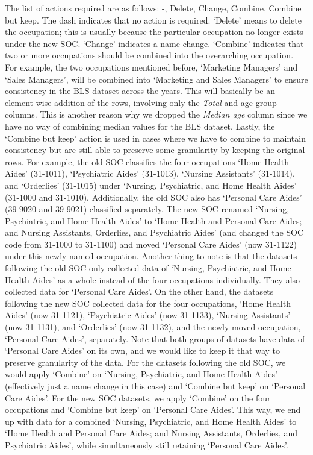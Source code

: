 \documentclass[11pt]{article}
\begin{document}
The list of actions required are as follows: -, Delete, Change, Combine, Combine but keep. The dash indicates that no action is required. `Delete' means to delete the occupation; this is usually because the particular occupation no longer exists under the new SOC. `Change' indicates a name change. `Combine' indicates that two or more occupations should be combined into the overarching occupation. For example, the two occupations mentioned before, `Marketing Managers' and `Sales Managers', will be combined into `Marketing and Sales Managers' to ensure consistency in the BLS dataset across the years. This will basically be an element-wise addition of the rows, involving only the \emph{Total} and age group columns. This is another reason why we dropped the \emph{Median age} column since we have no way of combining median values for the BLS dataset. Lastly, the `Combine but keep' action is used in cases where we have to combine to maintain consistency but are still able to preserve some granularity by keeping the original rows. For example, the old SOC classifies the four occupations `Home Health Aides' (31-1011), `Psychiatric Aides' (31-1013), `Nursing Assistants' (31-1014), and `Orderlies' (31-1015) under `Nursing, Psychiatric, and Home Health Aides' (31-1000 and 31-1010). Additionally, the old SOC also has `Personal Care Aides' (39-9020 and 39-9021) classified separately. The new SOC renamed `Nursing, Psychiatric, and Home Health Aides' to `Home Health and Personal Care Aides; and Nursing Assistants, Orderlies, and Psychiatric Aides' (and changed the SOC code from 31-1000 to 31-1100) and moved `Personal Care Aides' (now 31-1122) under this newly named occupation. Another thing to note is that the datasets following the old SOC only collected data of `Nursing, Psychiatric, and Home Health Aides' as a whole instead of the four occupations individually. They also collected data for `Personal Care Aides'. On the other hand, the datasets following the new SOC collected data for the four occupations, `Home Health Aides' (now 31-1121), `Psychiatric Aides' (now 31-1133), `Nursing Assistants' (now 31-1131), and `Orderlies' (now 31-1132), and the newly moved occupation, `Personal Care Aides', separately. Note that both groups of datasets have data of `Personal Care Aides' on its own, and we would like to keep it that way to preserve granularity of the data. For the datasets following the old SOC, we would apply `Combine' on `Nursing, Psychiatric, and Home Health Aides' (effectively just a name change in this case) and `Combine but keep' on `Personal Care Aides'. For the new SOC datasets, we apply `Combine' on the four occupations and `Combine but keep' on `Personal Care Aides'. This way, we end up with data for a combined `Nursing, Psychiatric, and Home Health Aides' to `Home Health and Personal Care Aides; and Nursing Assistants, Orderlies, and Psychiatric Aides', while simultaneously still retaining `Personal Care Aides'.
\end{document}
